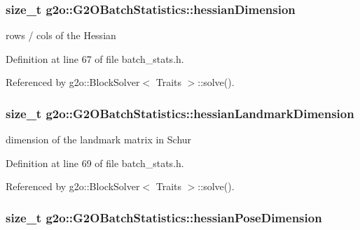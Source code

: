 \subsubsection[{\texorpdfstring{hessian\+Dimension}{hessianDimension}}]{\setlength{\rightskip}{0pt plus 5cm}size\+\_\+t g2o\+::\+G2\+O\+Batch\+Statistics\+::hessian\+Dimension}\hypertarget{structg2o_1_1G2OBatchStatistics_a618a15ba153da1a99b19a2d779cf3764}{}\label{structg2o_1_1G2OBatchStatistics_a618a15ba153da1a99b19a2d779cf3764}


rows / cols of the Hessian 



Definition at line 67 of file batch\+\_\+stats.\+h.



Referenced by g2o\+::\+Block\+Solver$<$ Traits $>$\+::solve().

\subsubsection[{\texorpdfstring{hessian\+Landmark\+Dimension}{hessianLandmarkDimension}}]{\setlength{\rightskip}{0pt plus 5cm}size\+\_\+t g2o\+::\+G2\+O\+Batch\+Statistics\+::hessian\+Landmark\+Dimension}\hypertarget{structg2o_1_1G2OBatchStatistics_a0cfa7018402074f47defb9cd5d9d4b64}{}\label{structg2o_1_1G2OBatchStatistics_a0cfa7018402074f47defb9cd5d9d4b64}


dimension of the landmark matrix in Schur 



Definition at line 69 of file batch\+\_\+stats.\+h.



Referenced by g2o\+::\+Block\+Solver$<$ Traits $>$\+::solve().

\subsubsection[{\texorpdfstring{hessian\+Pose\+Dimension}{hessianPoseDimension}}]{\setlength{\rightskip}{0pt plus 5cm}size\+\_\+t g2o\+::\+G2\+O\+Batch\+Statistics\+::hessian\+Pose\+Dimension}\hypertarget{structg2o_1_1G2OBatchStatistics_ae2af64720e3f99557924b9cf92ab6f20}{}\label{structg2o_1_1G2OBatchStatistics_ae2af64720e3f99557924b9cf92ab6f20}


